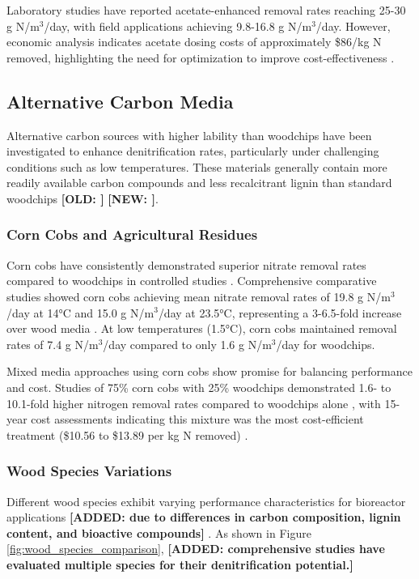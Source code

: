 \documentclass[12pt,a4paper]{article}
\newcommand{\added}[1]{\textcolor{addedtext}{\textbf{[ADDED: #1]}}}
\newcommand{\replaced}[2]{\textcolor{deletedtext}{\textbf{[OLD: #1]}} \textcolor{replacedtext}{\textbf{[NEW: #2]}}}
\begin{document}
Laboratory studies have reported acetate-enhanced removal rates reaching 25-30 g N/m$^3$/day, with field applications achieving 9.8-16.8 g N/m$^3$/day. However, economic analysis indicates acetate dosing costs of approximately \$86/kg N removed, highlighting the need for optimization to improve cost-effectiveness \citep{RN196}.

\subsection{Alternative Carbon Media}

Alternative carbon sources with higher lability than woodchips have been investigated to enhance denitrification rates, particularly under challenging conditions such as low temperatures. These materials generally contain more readily available carbon compounds and less recalcitrant lignin than standard woodchips \replaced{\citep{RN1180}}{\citep{RN624}}.

\subsubsection{Corn Cobs and Agricultural Residues}

Corn cobs have consistently demonstrated superior nitrate removal rates compared to woodchips in controlled studies \citep{RN350, RN624}. Comprehensive comparative studies showed corn cobs achieving mean nitrate removal rates of 19.8 g N/m$^3$/day at 14°C and 15.0 g N/m$^3$/day at 23.5°C, representing a 3-6.5-fold increase over wood media \citep{RN350, RN624}. At low temperatures (1.5°C), corn cobs maintained removal rates of 7.4 g N/m$^3$/day compared to only 1.6 g N/m$^3$/day for woodchips.

Mixed media approaches using corn cobs show promise for balancing performance and cost. Studies of 75\% corn cobs with 25\% woodchips demonstrated 1.6- to 10.1-fold higher nitrogen removal rates compared to woodchips alone \citep{RN350}, with 15-year cost assessments indicating this mixture was the most cost-efficient treatment (\$10.56 to \$13.89 per kg N removed) \citep{RN350}.

\subsubsection{Wood Species Variations}

Different wood species exhibit varying performance characteristics for bioreactor applications \added{due to differences in carbon composition, lignin content, and bioactive compounds} \citep{RN611}. As shown in Figure \ref{fig:wood_species_comparison}, \added{comprehensive studies have evaluated multiple species for their denitrification potential.}
\end{document}
